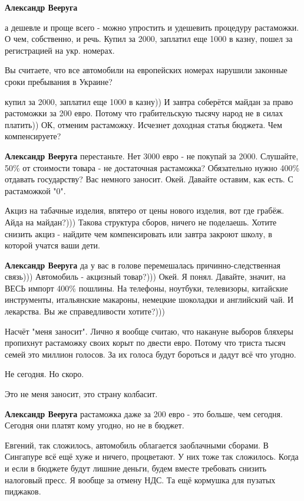 \begin{itemize}
\begin{itemize}
\textbf{Александр Вееруга} 

а дешевле и проще всего - можно упростить и удешевить процедуру растаможки. О
чем, собственно, и речь. Купил за 2000, заплатил еще 1000 в казну, пошел за
регистрацией на укр. номерах.

Вы считаете, что все автомобили на европейских номерах нарушили законные сроки пребывания в Украине?

купил за 2000, заплатил еще 1000 в казну))
И завтра соберётся майдан за право растоможки за 200 евро.
Потому что грабительскую тысячу народ не в силах платить))
ОК, отменим растаможку. Исчезнет доходная статья бюджета. Чем компенсируете?

\textbf{Александр Вееруга} перестаньте. Нет 3000 евро - не покупай за 2000.
Слушайте, 50\% от стоимости товара - не достаточная растаможка? Обязательно нужно 400\% отдавать государству?
Вас немного заносит.
Окей. Давайте оставим, как есть. С растаможкой "0".

Акциз на табачные изделия, впятеро от цены нового изделия, вот где грабёж. Айда на майдан?)))
Такова структура сборов, ничего не поделаешь.
Хотите снизить акциз - найдите чем компенсировать или завтра закроют школу, в которой учатся ваши дети.

\textbf{Александр Вееруга} да у вас в голове перемешалась причинно-следственная связь)))
Автомобиль - акцизный товар?)))
Окей. Я понял. Давайте, значит, на ВЕСЬ импорт 400\% пошлины. На телефоны, ноутбуки, телевизоры, китайские инструменты, итальянские макароны, немецкие шоколадки и английский чай.
И лекарства.
Вы же справедливости хотите?)))


Насчёт "меня заносит". Лично я вообще считаю, что накануне выборов бляхеры
пропихнут растаможку своих корыт по двести евро. Потому что триста тысяч семей
это миллион голосов. За их голоса будут бороться и дадут всё что угодно.

Не сегодня. Но скоро.

Это не меня заносит, это страну колбасит.

\textbf{Александр Вееруга} растаможка даже за 200 евро - это больше, чем сегодня. Сегодня они платят кому угодно, но не в бюджет.

Евгений, так сложилось, автомобиль облагается заоблачными сборами. В Сингапуре всё ещё хуже и ничего, процветают. У них тоже так сложилось.
Когда и если в бюджете будут лишние деньги, будем вместе требовать снизить налоговый пресс.
Я вообще за отмену НДС. Та ещё кормушка для пузатых пиджаков.


\end{itemize}
\end{itemize}
